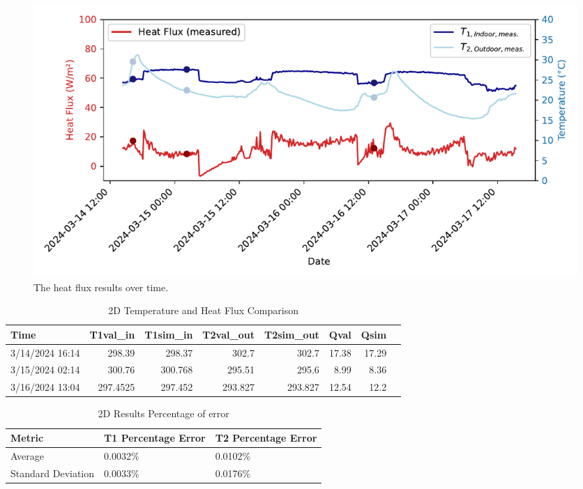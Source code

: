 \begin{figure}[htb]
     \centering
    \includegraphics[width=1\linewidth]{Figures/Validation}
     \caption[Experimental Report Plot]{The heat flux results over time.}
   \label{fig:expr}
 \end{figure}


\begin{table}[tbh]
    \caption{2D Temperature and Heat Flux Comparison}
    \label{table2d}
    \centering
    \begin{tabular}{lrrrrrrr}
        \toprule
        Time                & T1val\_in & T1sim\_in & T2val\_out & T2sim\_out & Qval & Qsim \\
        \midrule
        3/14/2024 16:14 & 298.39    & 298.37    & 302.7     & 302.7     & 17.38 & 17.29 \\
        3/15/2024 02:14  & 300.76    & 300.768   & 295.51    & 295.6     & 8.99  & 8.36  \\
        3/16/2024 13:04 & 297.4525  & 297.452   & 293.827   & 293.827   & 12.54 & 12.2  \\
        \bottomrule
    \end{tabular}
\end{table}

\begin{table}[]
 \caption{2D Results Percentage of error}
    \label{error2d}
     \centering
 \begin{tabular}{l l l}
        \toprule
        Metric & T1 Percentage Error & T2 Percentage Error \\
        \midrule
        Average & 0.0032\% & 0.0102\% \\
        Standard Deviation & 0.0033\% & 0.0176\% \\
        \bottomrule
    \end{tabular}
\end{table}


